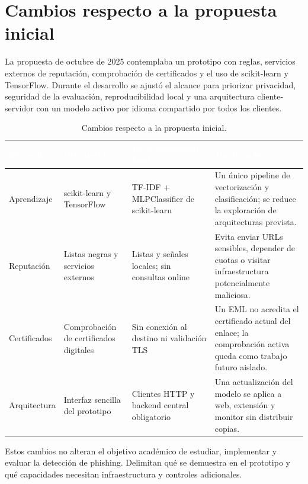\documentclass[11pt,a4paper,oneside]{report}
\begin{document}


\section{Cambios respecto a la propuesta inicial}

La propuesta de octubre de 2025 contemplaba un prototipo con reglas, servicios externos de reputación, comprobación de certificados y el uso de scikit-learn y TensorFlow. Durante el desarrollo se ajustó el alcance para priorizar privacidad, seguridad de la evaluación, reproducibilidad local y una arquitectura cliente-servidor con un modelo activo por idioma compartido por todos los clientes.

\begingroup
\begin{table}[H]
  \centering
  \small
  \caption{Cambios respecto a la propuesta inicial.}
  \label{tab:5-2}
  \begin{tabularx}{\textwidth}{|X|X|X|X|}
    \hline
    \rowcolor{uemcgreen}
    \textcolor{white}{\textbf{Elemento}} & \textcolor{white}{\textbf{Propuesta}} & \textcolor{white}{\textbf{Implementación final}} & \textcolor{white}{\textbf{Justificación}} \\
    \hline
    Aprendizaje & scikit-learn y TensorFlow & TF-IDF + MLPClassifier de scikit-learn & Un único pipeline de vectorización y clasificación; se reduce la exploración de arquitecturas prevista. \\
    \hline
    \rowcolor{tablelight}
    Reputación & Listas negras y servicios externos & Listas y señales locales; sin consultas online & Evita enviar URLs sensibles, depender de cuotas o visitar infraestructura potencialmente maliciosa. \\
    \hline
    Certificados & Comprobación de certificados digitales & Sin conexión al destino ni validación TLS & Un EML no acredita el certificado actual del enlace; la comprobación activa queda como trabajo futuro aislado. \\
    \hline
    \rowcolor{tablelight}
    Arquitectura & Interfaz sencilla del prototipo & Clientes HTTP y backend central obligatorio & Una actualización del modelo se aplica a web, extensión y monitor sin distribuir copias. \\
    \hline
  \end{tabularx}
\end{table}
\endgroup

Estos cambios no alteran el objetivo académico de estudiar, implementar y evaluar la detección de phishing. Delimitan qué se demuestra en el prototipo y qué capacidades necesitan infraestructura y controles adicionales.
\end{document}
